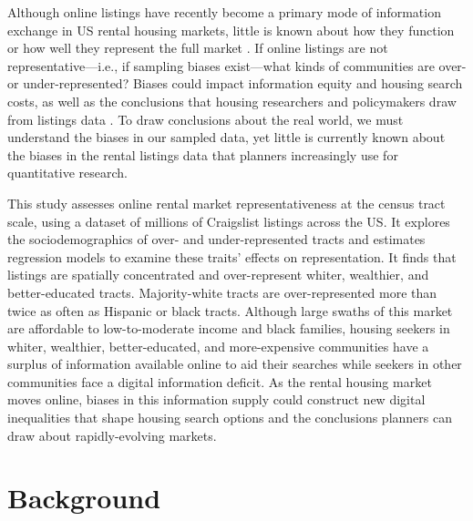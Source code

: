 \documentclass[11pt,letterpaper]{article}
\begin{document}
Although online listings have recently become a primary mode of information exchange in US rental housing markets, little is known about how they function or how well they represent the full market \citep{schachter_immigration_2017,besbris_language_2018,shaw_platform_2018}. If online listings are not representative---i.e., if sampling biases exist---what kinds of communities are over- or under-represented? Biases could impact information equity and housing search costs, as well as the conclusions that housing researchers and policymakers draw from listings data \citep{mclaughlin_data_2017,arribas-bel_use_2018,folch_fast_2018,narayanan_toward_2019}. To draw conclusions about the real world, we must understand the biases in our sampled data, yet little is currently known about the biases in the rental listings data that planners increasingly use for quantitative research.

This study assesses online rental market representativeness at the census tract scale, using a dataset of millions of Craigslist listings across the US. It explores the sociodemographics of over- and under-represented tracts and estimates regression models to examine these traits' effects on representation. It finds that listings are spatially concentrated and over-represent whiter, wealthier, and better-educated tracts. Majority-white tracts are over-represented more than twice as often as Hispanic or black tracts. Although large swaths of this market are affordable to low-to-moderate income and black families, housing seekers in whiter, wealthier, better-educated, and more-expensive communities have a surplus of information available online to aid their searches while seekers in other communities face a digital information deficit. As the rental housing market moves online, biases in this information supply could construct new digital inequalities that shape housing search options and the conclusions planners can draw about rapidly-evolving markets.

\section{Background}
\end{document}
